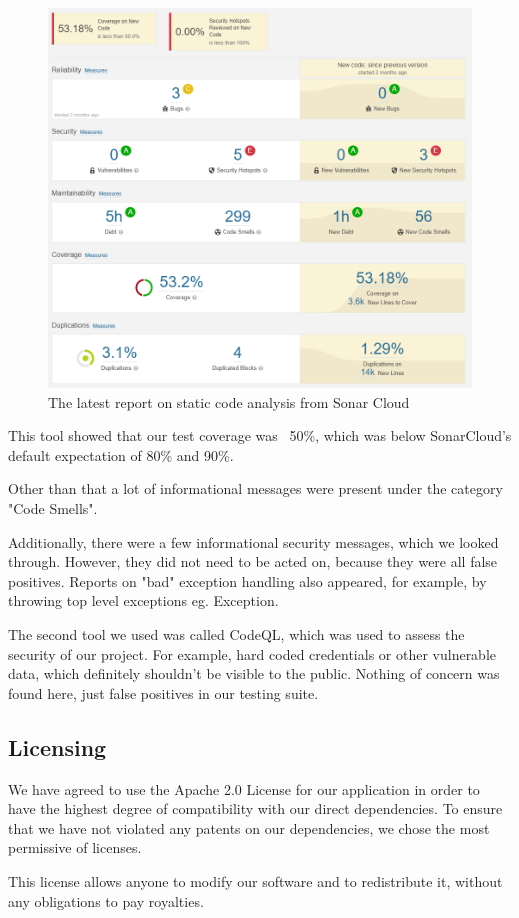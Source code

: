 \begin{figure}[h!]
    \centering
    \includegraphics[scale=0.5]{images/sonar_latest_report.PNG}
    \caption{The latest report on static code analysis from Sonar Cloud}
\end{figure}

This tool showed that our test coverage was ~50\%, which was below SonarCloud's default expectation of 80\% and 90\%.

Other than that a lot of informational messages were present under the category "Code Smells". %

Additionally, there were a few informational security messages, which we looked through. 
However, they did not need to be acted on, because they were all false positives. 
Reports on "bad" exception handling also appeared, for example, by throwing top level exceptions eg. Exception. 

The second tool we used was called CodeQL, which was used to assess the security of our project. 
For example, hard coded credentials or other vulnerable data, which definitely shouldn't be visible to the public. 
Nothing of concern was found here, just false positives in our testing suite.

\newpage

\subsection{Licensing}

We have agreed to use the Apache 2.0 License for our application in order to have the highest degree of compatibility with our direct dependencies. 
To ensure that we have not violated any patents on our dependencies, we chose the most permissive of licenses. 

This license allows anyone to modify our software and to redistribute it, without any obligations to pay royalties.